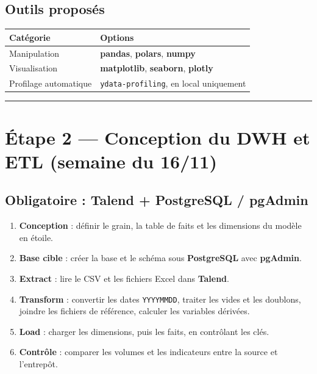 \documentclass[11pt,a4paper]{article}
\providecommand{\tightlist}{\setlength{\itemsep}{0pt}\setlength{\parskip}{0pt}}
\begin{document}
\subsection{Outils proposés}\label{outils-proposuxe9s-1}

{\def\LTcaptype{none} %
\begin{longtable}[]{@{}ll@{}}
\toprule\noalign{}
Catégorie & Options \\
\midrule\noalign{}
\endhead
\bottomrule\noalign{}
\endlastfoot
Manipulation & \textbf{pandas}, \textbf{polars}, \textbf{numpy} \\
Visualisation & \textbf{matplotlib}, \textbf{seaborn},
\textbf{plotly} \\
Profilage automatique & \texttt{ydata-profiling}, en local uniquement \\
\end{longtable}
}

\begin{center}\rule{0.5\linewidth}{0.5pt}\end{center}

\section{Étape 2 --- Conception du DWH et ETL (semaine du
16/11)}\label{uxe9tape-2-conception-du-dwh-et-etl-semaine-du-1611}

\subsection{Obligatoire : Talend + PostgreSQL /
pgAdmin}\label{obligatoire-talend-postgresql-pgadmin}

\begin{enumerate}
\def\labelenumi{\arabic{enumi}.}
\tightlist
\item
  \textbf{Conception} : définir le grain, la table de faits et les
  dimensions du modèle en étoile.
\item
  \textbf{Base cible} : créer la base et le schéma sous
  \textbf{PostgreSQL} avec \textbf{pgAdmin}.
\item
  \textbf{Extract} : lire le CSV et les fichiers Excel dans
  \textbf{Talend}.
\item
  \textbf{Transform} : convertir les dates \texttt{YYYYMMDD}, traiter
  les vides et les doublons, joindre les fichiers de référence, calculer
  les variables dérivées.
\item
  \textbf{Load} : charger les dimensions, puis les faits, en contrôlant
  les clés.
\item
  \textbf{Contrôle} : comparer les volumes et les indicateurs entre la
  source et l'entrepôt.
\end{enumerate}
\end{document}
